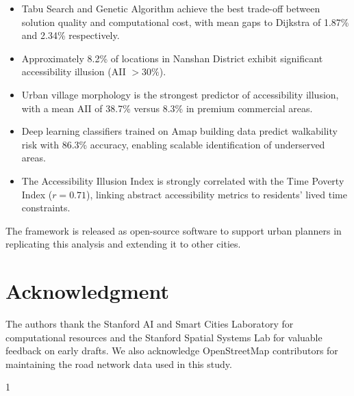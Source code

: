 \documentclass[journal]{IEEEtran}
\begin{document}
\begin{itemize}
    \item Tabu Search and Genetic Algorithm achieve the best trade-off between solution quality and computational cost, with mean gaps to Dijkstra of 1.87\% and 2.34\% respectively.
    \item Approximately 8.2\% of locations in Nanshan District exhibit significant accessibility illusion (AII $> 30\%$).
    \item Urban village morphology is the strongest predictor of accessibility illusion, with a mean AII of 38.7\% versus 8.3\% in premium commercial areas.
    \item Deep learning classifiers trained on Amap building data predict walkability risk with 86.3\% accuracy, enabling scalable identification of underserved areas.
    \item The Accessibility Illusion Index is strongly correlated with the Time Poverty Index ($r = 0.71$), linking abstract accessibility metrics to residents' lived time constraints.
\end{itemize}

The framework is released as open-source software to support urban planners in replicating this analysis and extending it to other cities.

\section*{Acknowledgment}

The authors thank the Stanford AI and Smart Cities Laboratory for computational resources and the Stanford Spatial Systems Lab for valuable feedback on early drafts. We also acknowledge OpenStreetMap contributors for maintaining the road network data used in this study.

\begin{thebibliography}{1}



\addtolength{\itemsep}{-0.5ex}












\end{thebibliography}
\end{document}
